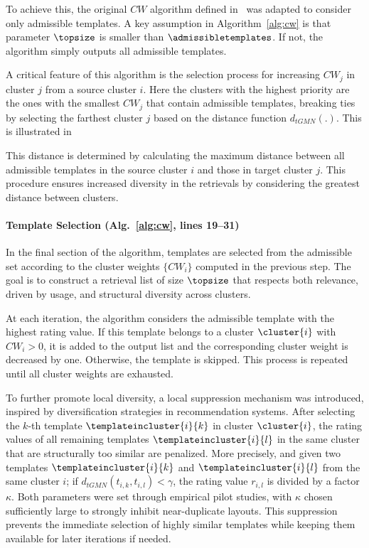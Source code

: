 To achieve this, the original $CW$ algorithm defined in~\cite{clusdiv} was adapted to consider only admissible templates. A key assumption in Algorithm~\ref{alg:cw} is that parameter $\topsize$ is smaller than $\admissibletemplates$. If not, the algorithm simply outputs all admissible templates. 

A critical feature of this algorithm is the selection process for increasing  $CW_j$ in cluster $j$ from a source cluster $i$. Here the clusters with the highest priority are the ones with the smallest $CW_j$ that contain admissible templates, breaking ties by selecting the farthest cluster $j$ based on the distance function $d_{tGMN}(.)$. This is illustrated in 

This distance is determined by calculating the maximum distance between all admissible templates in the source cluster $i$ and those in target cluster $j$. This procedure ensures increased diversity in the retrievals by considering the greatest distance between clusters.

\paragraph{Template Selection (Alg.~\ref{alg:cw}, lines 19--31)}
In the final section of the algorithm, templates are selected from the admissible set according to the cluster weights $\{CW_i\}$ computed in the previous step. The goal is to construct a retrieval list of size $\topsize$ that respects both relevance, driven by usage, and structural diversity across clusters.

At each iteration, the algorithm considers the admissible template with the highest rating value.
If this template belongs to a cluster $\cluster{i}$ with $CW_i > 0$, it is added to the output list and the corresponding cluster weight is decreased by one. Otherwise, the template is skipped. This process is repeated until all cluster weights are exhausted.

To further promote local diversity,  a local suppression mechanism was introduced, inspired by diversification strategies in recommendation systems.
After selecting the $k$-th template $\templateincluster{i}{k}$ in cluster $\cluster{i}$, the rating values of all remaining templates $\templateincluster{i}{l}$ in the same cluster that are structurally too similar are penalized.
More precisely, and given two templates $\templateincluster{i}{k}$ and $\templateincluster{i}{l}$ from the same cluster $i$; if $d_{tGMN}(t_{i,k}, t_{i,l}) < \gamma$, the rating value $r_{i,l}$ is divided by a factor $\kappa$. Both parameters were set through empirical pilot studies, with $\kappa$ chosen sufficiently large to strongly inhibit near-duplicate layouts.
This suppression prevents the immediate selection of highly similar templates while keeping them available for later iterations if needed.

